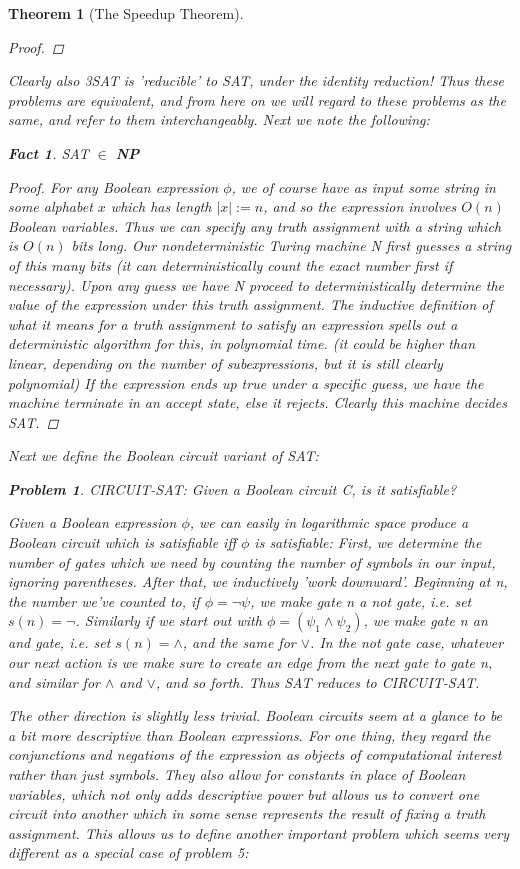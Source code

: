 \documentclass{article}
\theoremstyle{definition}
\newtheorem{problem}{Problem}
\theoremstyle{plain}
\theoremstyle{theorem}
\newtheorem{fact}{Fact}[section]
\newtheorem{theorem}{Theorem}[section]
\begin{document}
\begin{theorem}[The Speedup Theorem]
\begin{proof}
\end{proof}
Clearly also 3SAT is 'reducible' to SAT, under the identity reduction! Thus these problems are equivalent, and from here on we will regard to these problems as the same, and refer to them interchangeably. Next we note the following:
\begin{fact}
    SAT $\in$ \textbf{NP}
\end{fact}
\begin{proof}
    For any Boolean expression $\phi$, we of course have as input some string in some alphabet $x$ which has length $|x| := n$, and so the expression involves $O(n)$ Boolean variables. Thus we can specify any truth assignment with a string which is $O(n)$ bits long. Our nondeterministic Turing machine N first guesses a string of this many bits (it can deterministically count the exact number first if necessary). Upon any guess we have N proceed to deterministically determine the value of the expression under this truth assignment. The inductive definition of what it means for a truth assignment to satisfy an expression spells out a deterministic algorithm for this, in polynomial time. (it could be higher than linear, depending on the number of subexpressions, but it is still clearly polynomial) If the expression ends up true under a specific guess, we have the machine terminate in an accept state, else it rejects. Clearly this machine decides SAT. 
\end{proof}
Next we define the Boolean circuit variant of SAT:
\begin{problem}
    CIRCUIT-SAT: Given a Boolean circuit C, is it satisfiable?
\end{problem}
Given a Boolean expression $\phi$, we can easily in logarithmic space produce a Boolean circuit which is satisfiable iff $\phi$ is satisfiable: First, we determine the number of gates which we need by counting the number of symbols in our input, ignoring parentheses. After that, we inductively 'work downward'. Beginning at n, the number we've counted to, if $\phi = \neg \psi$, we make gate n a not gate, i.e. set $s(n)=\neg$. Similarly if we start out with $\phi = (\psi_1 \wedge \psi_2)$, we make gate n an and gate, i.e. set $s(n)= \wedge$, and the same for $\vee$. In the not gate case, whatever our next action is we make sure to create an edge from the next gate to gate n, and similar for $\wedge$ and $\vee$, and so forth. Thus SAT reduces to CIRCUIT-SAT.
\par The other direction is slightly less trivial. Boolean circuits seem at a glance to be a bit more descriptive than Boolean expressions. For one thing, they regard the conjunctions and negations of the expression as objects of computational interest rather than just symbols. They also allow for constants in place of Boolean variables, which not only adds descriptive power but allows us to convert one circuit into another which in some sense represents the result of fixing a truth assignment. This allows us to define another important problem which seems very different as a special case of problem 5:

\end{theorem}
\end{document}
